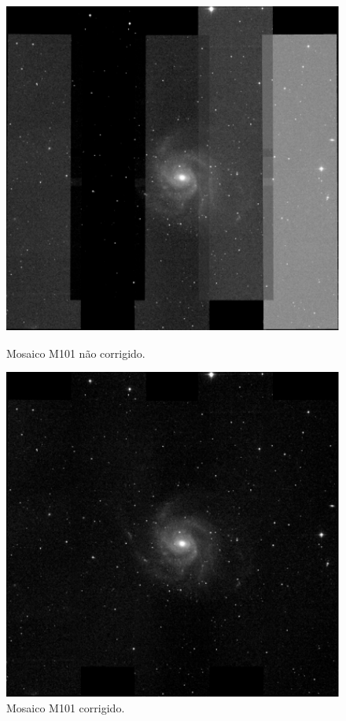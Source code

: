 \documentclass[12pt]{report} %
\begin{document}
	
	\begin{figure}[!htb]%
	    \begin{minipage}[b]{0.5\linewidth} %
		\centering
		\includegraphics[scale=0.5]{imagens/mosaico1.pdf} 
		\caption{Mosaico M101 não corrigido.}
		\label{fig:Mosaico}
	    \end{minipage}
	    \hspace{0.2cm} %
	    \begin{minipage}[b]{0.5\linewidth}
		\centering
		\includegraphics[scale=0.5]{imagens/mosaico2.pdf} 
		\caption{Mosaico M101 corrigido.}
		\label{fig:MosaicoCorrigido}
	    \end{minipage}
	\end{figure}	    
	    
\end{document}
